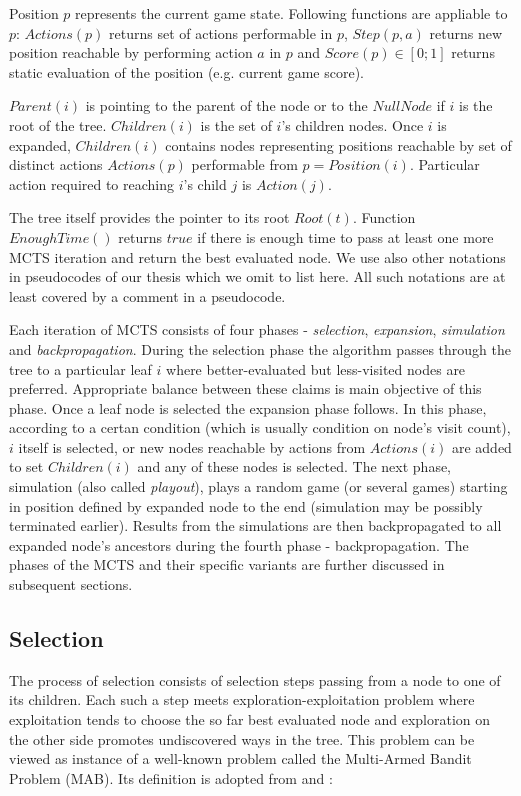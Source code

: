 Position $p$ represents the current game state. Following
functions are appliable to $p$: $Actions(p)$ returns set of actions performable in $p$,
$Step(p, a)$ returns new position reachable by performing action $a$ in $p$ and $Score(p) \in
[0;1]$ returns static evaluation of the position (e.g. current game score).

$Parent(i)$ is
pointing to the parent of the node or to the $NullNode$ if $i$ is the root of the tree.
$Children(i)$ is the set of $i$'s children nodes. Once $i$ is expanded, $Children(i)$ contains
nodes representing positions reachable by set of
distinct actions $Actions(p)$ performable from $p = Position(i)$.
Particular action required to reaching $i$'s child $j$ is $Action(j)$.

The
tree itself provides the pointer to its root $Root(t)$. Function $EnoughTime()$ returns $true$ if
there is enough time to pass at least one more MCTS iteration and return the best evaluated
node. We use also other notations in pseudocodes of our thesis which we omit to list here. All
such notations are at least covered by a comment in a pseudocode.

Each iteration of MCTS consists of four
phases - \emph{selection}, \emph{expansion}, \emph{simulation} and \emph{backpropagation}. During
the selection phase the 
algorithm passes through the tree to a particular leaf $i$ where better-evaluated but less-visited nodes
are preferred. Appropriate balance between these claims is main objective of this
phase. Once a leaf node is selected the expansion phase follows. In this phase, according to a
certan condition (which is usually condition on node's visit count), $i$ itself is selected, or
new nodes reachable by actions from $Actions(i)$ are added to set $Children(i)$ and any of these
nodes is selected.
The next phase, simulation (also called \emph{playout}), plays a random game (or several games) 
starting
in position defined by expanded node to the end (simulation may be possibly terminated earlier).
Results from the simulations are then backpropagated to all
expanded node's ancestors during the fourth phase - backpropagation. The phases of the MCTS and
their specific variants are
further discussed in subsequent sections.



\subsection{Selection}


The process of selection consists of selection steps passing from a node to one of its children.
Each such a step meets exploration-exploitation problem where exploitation tends to choose the
so far best evaluated node and exploration on the other side promotes
undiscovered ways in the tree. This problem can be viewed as instance of a well-known problem 
called the Multi-Armed Bandit Problem (MAB). Its definition is adopted from \cite{Auer2002} and 
\cite{Kocsis2006}:

